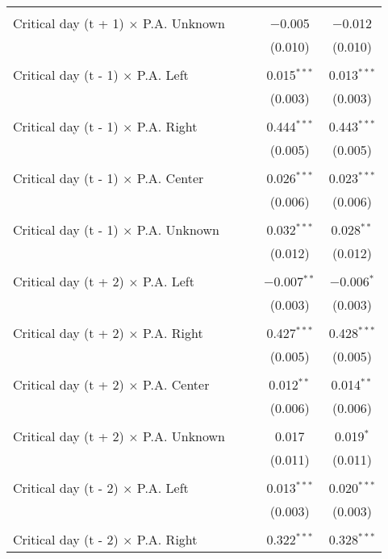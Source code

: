 \documentclass[
]{article}
\begin{document}
\begin{table}[!htbp]
{\begin{tabular}{@{\extracolsep{5pt}}lcccc}
  & & & & \\ 
 Critical day (t + 1) $\times$ P.A. Unknown &  &  & $-$0.005 & $-$0.012 \\ 
  &  &  & (0.010) & (0.010) \\ 
  & & & & \\ 
 Critical day (t - 1) $\times$ P.A. Left &  &  & 0.015$^{***}$ & 0.013$^{***}$ \\ 
  &  &  & (0.003) & (0.003) \\ 
  & & & & \\ 
 Critical day (t - 1) $\times$ P.A. Right &  &  & 0.444$^{***}$ & 0.443$^{***}$ \\ 
  &  &  & (0.005) & (0.005) \\ 
  & & & & \\ 
 Critical day (t - 1) $\times$ P.A. Center &  &  & 0.026$^{***}$ & 0.023$^{***}$ \\ 
  &  &  & (0.006) & (0.006) \\ 
  & & & & \\ 
 Critical day (t - 1) $\times$ P.A. Unknown &  &  & 0.032$^{***}$ & 0.028$^{**}$ \\ 
  &  &  & (0.012) & (0.012) \\ 
  & & & & \\ 
 Critical day (t + 2) $\times$ P.A. Left &  &  & $-$0.007$^{**}$ & $-$0.006$^{*}$ \\ 
  &  &  & (0.003) & (0.003) \\ 
  & & & & \\ 
 Critical day (t + 2) $\times$ P.A. Right &  &  & 0.427$^{***}$ & 0.428$^{***}$ \\ 
  &  &  & (0.005) & (0.005) \\ 
  & & & & \\ 
 Critical day (t + 2) $\times$ P.A. Center &  &  & 0.012$^{**}$ & 0.014$^{**}$ \\ 
  &  &  & (0.006) & (0.006) \\ 
  & & & & \\ 
 Critical day (t + 2) $\times$ P.A. Unknown &  &  & 0.017 & 0.019$^{*}$ \\ 
  &  &  & (0.011) & (0.011) \\ 
  & & & & \\ 
 Critical day (t - 2) $\times$ P.A. Left &  &  & 0.013$^{***}$ & 0.020$^{***}$ \\ 
  &  &  & (0.003) & (0.003) \\ 
  & & & & \\ 
 Critical day (t - 2) $\times$ P.A. Right &  &  & 0.322$^{***}$ & 0.328$^{***}$ \\ 

\end{tabular}}
\end{table}
\end{document}
